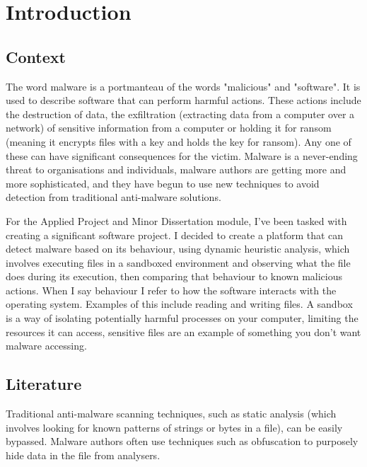 \chapter{Introduction}

\section{Context}
The word malware is a portmanteau of the words "malicious" and "software".
It is used to describe software that can perform harmful actions.
These actions include the destruction of data,
the exfiltration (extracting data from a computer over a network)
of sensitive information from a computer or
holding it for ransom (meaning it encrypts files with a key and holds the key for ransom).
Any one of these can have significant consequences for the victim.
Malware is a never-ending threat to organisations and individuals,
malware authors are getting more and more sophisticated,
and they have begun to use new techniques to avoid detection
from traditional anti-malware solutions.

For the Applied Project and Minor Dissertation module,
I've been tasked with creating a significant software project.
I decided to create a platform that can detect malware based on its behaviour,
using dynamic heuristic analysis, which involves executing files
in a sandboxed environment and observing what the file does during its execution,
then comparing that behaviour to known malicious actions.
When I say behaviour I refer to how the
software interacts with the operating system.
Examples of this include reading and writing files.
A sandbox is a way of isolating potentially harmful processes on your computer,
limiting the resources it can access,
sensitive files are an example of something you don't want malware accessing.

\section{Literature}
Traditional anti-malware scanning techniques, such as static analysis
(which involves looking for known patterns of strings or bytes in a file),
can be easily bypassed. Malware authors often use techniques such as obfuscation
\cite{4413008} to purposely hide data in the file from analysers.

